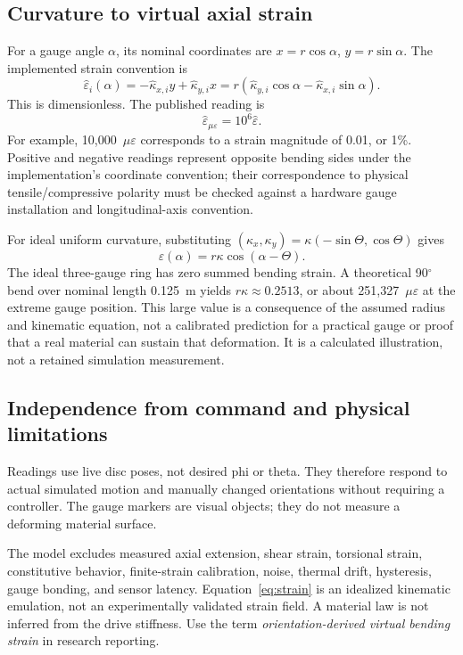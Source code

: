 \documentclass[11pt,letterpaper]{article}
\newcommand{\microstrain}{\ensuremath{\mu\varepsilon}}
\newcommand{\degrees}{\ensuremath{^{\circ}}}
\begin{document}
\subsection{Curvature to virtual axial strain}
For a gauge angle $\alpha$, its nominal coordinates are
$x=r\cos\alpha$, $y=r\sin\alpha$. The implemented strain convention is
\begin{equation}
\hat\varepsilon_i(\alpha)
 =-\hat\kappa_{x,i}y+\hat\kappa_{y,i}x
 =r\left(\hat\kappa_{y,i}\cos\alpha
              -\hat\kappa_{x,i}\sin\alpha\right).
\label{eq:strain}
\end{equation}
This is dimensionless. The published reading is
\begin{equation}
\hat\varepsilon_{\microstrain}=10^6\hat\varepsilon.
\end{equation}
For example, 10,000~\microstrain{} corresponds to a strain magnitude of 0.01,
or 1\%. Positive and negative readings represent opposite bending sides
under the implementation's coordinate convention; their correspondence to
physical tensile/compressive polarity must be checked against a hardware
gauge installation and longitudinal-axis convention.

For ideal uniform curvature, substituting
$(\kappa_x,\kappa_y)=\kappa(-\sin\Theta,\cos\Theta)$ gives
\begin{equation}
\varepsilon(\alpha)=r\kappa\cos(\alpha-\Theta).
\end{equation}
The ideal three-gauge ring has zero summed bending strain. A theoretical
90\degrees{} bend over nominal length 0.125~m yields
$r\kappa\approx0.2513$, or about 251,327~\microstrain{} at the extreme gauge
position. This large value is a consequence of the assumed radius and
kinematic equation, not a calibrated prediction for a practical gauge or
proof that a real material can sustain that deformation. It is a calculated
illustration, not a retained simulation measurement.

\subsection{Independence from command and physical limitations}
Readings use live disc poses, not desired phi or theta. They therefore respond
to actual simulated motion and manually changed orientations without requiring
a controller. The gauge markers are visual objects; they do not measure a
deforming material surface.

The model excludes measured axial extension, shear strain, torsional strain,
constitutive behavior, finite-strain calibration, noise, thermal drift,
hysteresis, gauge bonding, and sensor latency. Equation~\eqref{eq:strain} is
an idealized kinematic emulation, not an experimentally validated strain field.
A material law is not inferred from the drive stiffness. Use the term
\emph{orientation-derived virtual bending strain} in research reporting.
\end{document}
